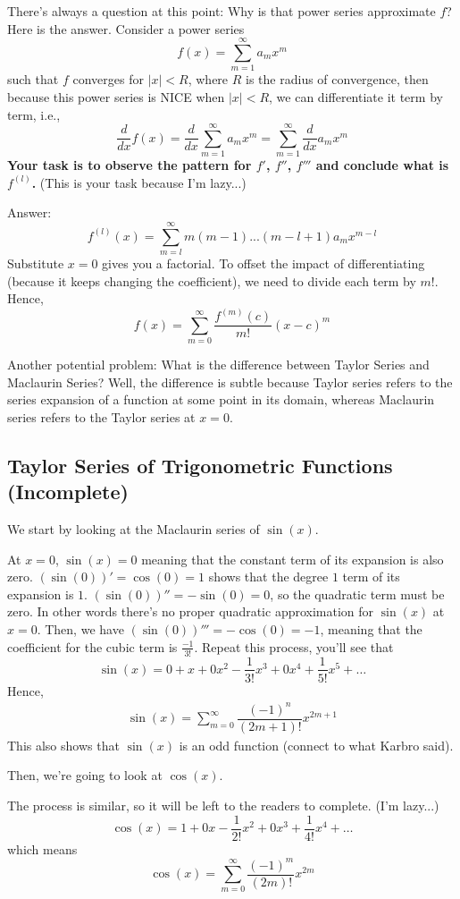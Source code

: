 \documentclass{article}
\theoremstyle{definition}
\theoremstyle{definition}
\theoremstyle{definition}
\theoremstyle{definition}
\theoremstyle{definition}
\theoremstyle{definition}
\theoremstyle{definition}
\theoremstyle{definition}
\theoremstyle{definition}
\begin{document}
There's always a question at this point: Why is that power series approximate $f$? Here is the answer.
Consider a power series
\[f(x)=\sum_{m=1}^\infty a_mx^m\]
such that $f$ converges for $|x|<R$, where $R$ is the radius of convergence, then because this power series is NICE when $|x|<R$, we can differentiate it term by term, i.e.,
\[\dfrac{d}{dx}f(x)=\dfrac{d}{dx}\sum_{m=1}^\infty a_mx^m=\sum_{m=1}^\infty\dfrac{d}{dx} a_mx^m\]
\textbf{Your task is to observe the pattern for $f'$, $f''$, $f'''$ and conclude what is $f^{(l)}$.} (This is your task because I'm lazy...)

Answer:
\[
f^{(l)}(x)=\sum_{m=l}^\infty m(m-1)...(m-l+1)a_mx^{m-l}
\]
Substitute $x=0$ gives you a factorial. To offset the impact of differentiating (because it keeps changing the coefficient), we need to divide each term by $m!$. Hence,
\[f(x)=\sum_{m=0}^\infty\dfrac{f^{(m)}(c)}{m!}(x-c)^m\]

Another potential problem: What is the difference between Taylor Series and Maclaurin Series? Well, the difference is subtle because Taylor series refers to the series expansion of a function at some point in its domain, whereas Maclaurin series refers to the Taylor series at $x=0$.

\subsection{Taylor Series of Trigonometric Functions (Incomplete)}
We start by looking at the Maclaurin series of $\sin(x)$.

At $x=0$, $\sin(x)=0$ meaning that the constant term of its expansion is also zero. $(\sin(0))'=\cos(0)=1$ shows that the degree $1$ term of its expansion is $1$. $(\sin(0))''=-\sin(0)=0$, so the quadratic term must be zero. In other words there's no proper quadratic approximation for $\sin(x)$ at $x=0$. Then, we have $(\sin(0))'''=-\cos(0)=-1$, meaning that the coefficient for the cubic term is $\frac{-1}{3!}$. Repeat this process, you'll see that 
\[\sin(x)=0+x+0x^2-\dfrac{1}{3!}x^3+0x^4+\frac{1}{5!}x^5+\ldots\]
Hence,
\begin{align*}
    \sin(x)=\sum_{m=0}^\infty\dfrac{(-1)^n}{(2m+1)!}x^{2m+1}
\end{align*}
This also shows that $\sin(x)$ is an odd function (connect to what Karbro said).

Then, we're going to look at $\cos(x)$.

The process is similar, so it will be left to the readers to complete. (I'm lazy...)
\[
\cos(x)=1+0x-\dfrac{1}{2!}x^2+0x^3+\dfrac{1}{4!}x^4+\ldots
\]
which means
\[
\cos(x)=\sum_{m=0}^\infty\dfrac{(-1)^m}{(2m)!}x^{2m}
\]
\end{document}
